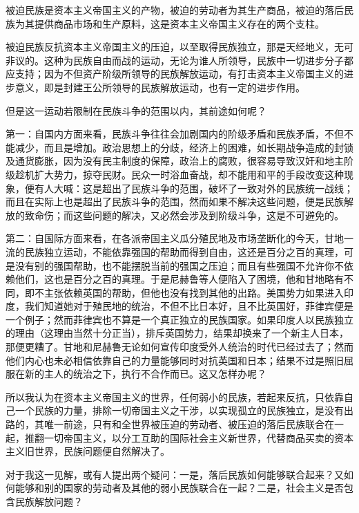 \documentclass[
  openany,           %
  12pt,              %
  a4paper            %
]{ctexbook}
\begin{document}
\quad\quad 被迫民族是资本主义帝国主义的产物，被迫的劳动者为其生产商品，被迫的落后民族为其提供商品市场和生产原料，这是资本主义帝国主义存在的两个支柱。

被迫民族反抗资本主义帝国主义的压迫，以至取得民族独立，那是天经地义，无可非议的。这种为民族自由而战的运动，无论为谁人所领导，民族中一切进步分子都应支持；因为不但资产阶级所领导的民族解放运动，有打击资本主义帝国主义的进步意义，即是封建王公所领导的民族解放运动，也有一定的进步作用。

但是这一运动若限制在民族斗争的范围以内，其前途如何呢？

第一：自国内方面来看，民族斗争往往会加剧国内的阶级矛盾和民族矛盾，不但不能减少，而且是增加。政治思想上的分歧，经济上的困难，如长期战争造成的封锁及通货膨胀，因为没有民主制度的保障，政治上的腐败，很容易导致汉奸和地主阶级趁机扩大势力，掠夺民财。民众一时浴血奋战，却不能用和平的手段改变这种现象，便有人大喊：这是超出了民族斗争的范围，破坏了一致对外的民族统一战线；而且在实际上也是超出了民族斗争的范围，然而如果不解决这些问题，便是民族解放的致命伤；而这些问题的解决，又必然会涉及到阶级斗争，这是不可避免的。

第二：自国际方面来看，在各派帝国主义瓜分殖民地及市场垄断化的今天，甘地一流的民族独立运动，不能依靠强国的帮助而得到自由，这还是百分之百的真理，可是没有别的强国帮助，也不能摆脱当前的强国之压迫；而且有些强国不允许你不依赖他们，这也是百分之百的真理。于是尼赫鲁等人便陷入了困境，他和甘地略有不同，即不主张依赖英国的帮助，但他也没有找到其他的出路。美国势力如果进入印度，我们知道她对于殖民地的统治，不但不比日本好，且不比英国好，菲律宾便是一个例子；然而菲律宾也不算是一个真正独立的民族国家。如果印度人以民族独立的理由（这理由当然十分正当），排斥英国势力，结果却换来了一个新主人日本，那便更糟了。甘地和尼赫鲁无论如何宣传印度受外人统治的时代已经过去了；然而他们内心也未必相信依靠自己的力量能够同时对抗英国和日本；结果不过是照旧屈服在新的主人的统治之下，执行不合作而已。这又怎样办呢？

所以我认为在资本主义帝国主义的世界，任何弱小的民族，若起来反抗，只依靠自己一个民族的力量，排除一切帝国主义之干涉，以实现孤立的民族独立，是没有出路的，其唯一前途，只有和全世界被压迫的劳动者、被压迫的落后民族联合在一起，推翻一切帝国主义，以分工互助的国际社会主义新世界，代替商品买卖的资本主义旧世界，民族问题便自然解决了。

对于我这一见解，或有人提出两个疑问：一是，落后民族如何能够联合起来？又如何能够和别的国家的劳动者及其他的弱小民族联合在一起？二是，社会主义是否包含民族解放问题？
\end{document}
